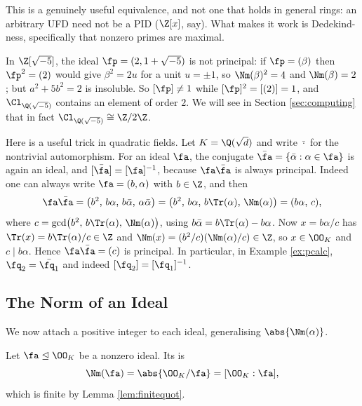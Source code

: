 \begin{remark}
	This is a genuinely useful equivalence, and not one that holds in general rings: an arbitrary UFD need not be a PID ($\Z[x]$, say). What makes it work is Dedekind-ness, specifically that nonzero primes are maximal.
\end{remark}

\begin{example}\label{ex:clsqrt5}
	In $\Z[\sqrt{-5}]$, the ideal $\fp = (2,1+\sqrt{-5})$ is not principal: if $\fp = (\beta)$ then $\fp^2 = (2)$ would give $\beta^2 = 2u$ for a unit $u = \pm1$, so $\Nm(\beta)^2 = 4$ and $\Nm(\beta) = 2$; but $a^2+5b^2 = 2$ is insoluble. So $[\fp] \neq 1$ while $[\fp]^2 = [(2)] = 1$, and $\Cl_{\Q(\sqrt{-5})}$ contains an element of order $2$. We will see in Section \ref{sec:computing} that in fact $\Cl_{\Q(\sqrt{-5})} \cong \Z/2\Z$.
\end{example}

\begin{example}\label{ex:conjinverse}
	Here is a useful trick in quadratic fields. Let $K = \Q(\sqrt d)$ and write $\bar{\cdot}$ for the nontrivial automorphism. For an ideal $\fa$, the conjugate $\bar\fa = \{\bar\alpha : \alpha \in \fa\}$ is again an ideal, and $[\bar\fa] = [\fa]^{-1}$, because $\fa\bar\fa$ is always principal. Indeed one can always write $\fa = (b, \alpha)$ with $b \in \Z$, and then
	$$\fa\bar\fa = \left(b^2,\, b\alpha,\, b\bar\alpha,\, \alpha\bar\alpha\right) = \left(b^2,\, b\alpha,\, b\Tr(\alpha),\, \Nm(\alpha)\right) = (b\alpha,\, c),$$
	where $c = \gcd\!\left(b^2,\, b\Tr(\alpha),\, \Nm(\alpha)\right)$,
	using $b\bar\alpha = b\Tr(\alpha) - b\alpha$. Now $x = b\alpha/c$ has $\Tr(x) = b\Tr(\alpha)/c \in \Z$ and $\Nm(x) = (b^2/c)(\Nm(\alpha)/c) \in \Z$, so $x \in \OO_K$ and $c \mid b\alpha$. Hence $\fa\bar\fa = (c)$ is principal. In particular, in Example \ref{ex:pcalc}, $\fq_2 = \bar{\fq_1}$ and indeed $[\fq_2] = [\fq_1]^{-1}$.
\end{example}

\subsection{The Norm of an Ideal}

We now attach a positive integer to each ideal, generalising $\abs{\Nm(\alpha)}$.

\begin{definition}
	Let $\fa \trianglelefteq \OO_K$ be a nonzero ideal. Its  is
	$$\Nm(\fa) = \abs{\OO_K/\fa} = [\OO_K : \fa],$$
	which is finite by Lemma \ref{lem:finitequot}.
\end{definition}

